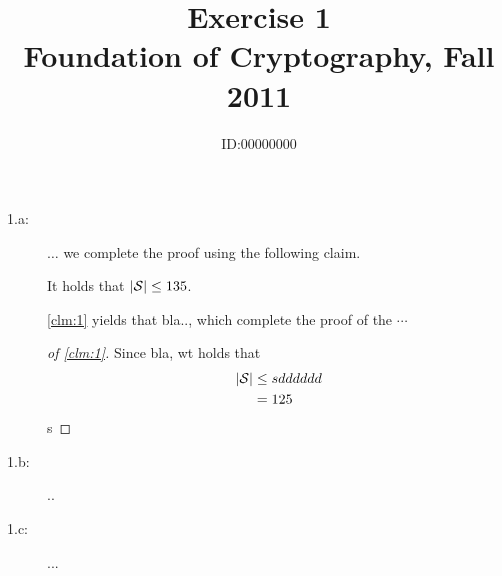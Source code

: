 \documentclass[12pt]{article}
\title{Exercise  1\\ \large{Foundation of Cryptography, Fall 2011}}
\author{ID:00000000}
\begin{document}
\maketitle
\begin{description}
  \item[1.a:]  $\dots$
we complete the proof using the following claim.
\begin{claim}[$\cs$ is small]\label{clm:1}
It holds that $\left|{\cal{S}}\right| \leq 135$.
\end{claim}
\cref{clm:1}  yields that bla.., which complete the proof of the $\cdots$
\begin{proof}[of \cref{clm:1}]
Since bla, wt holds that
\begin{align}
\left|{\cal{S}}\right|&\leq sdddddd\\
&= 125\nonumber
\end{align}s
\end{proof}

  \item[1.b:] ..
  \item[1.c:] ...
\end{description}
\end{document}
